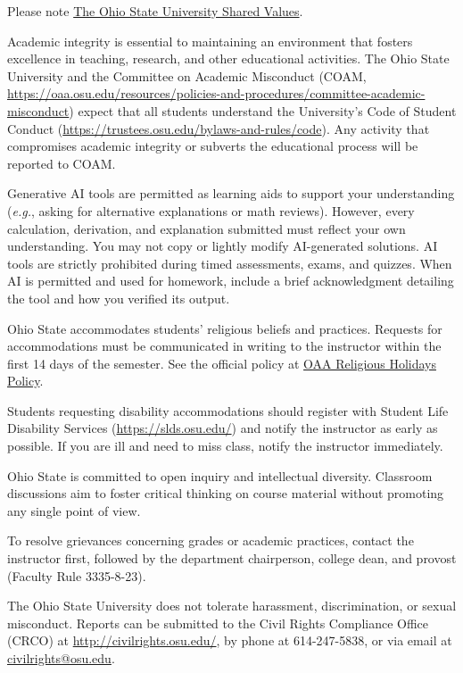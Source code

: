 Please note \href{https://www.osu.edu/shared-values}{The Ohio State University Shared Values}.

Academic integrity is essential to maintaining an environment that fosters excellence in teaching, research, and other educational activities. The Ohio State University and the Committee on Academic Misconduct (COAM, \href{https://oaa.osu.edu/resources/policies-and-procedures/committee-academic-misconduct}{https://oaa.osu.edu/resources/policies-and-procedures/committee-academic-misconduct}) expect that all students understand the University's Code of Student Conduct (\href{https://trustees.osu.edu/bylaws-and-rules/code}{https://trustees.osu.edu/bylaws-and-rules/code}). Any activity that compromises academic integrity or subverts the educational process will be reported to COAM.

Generative AI tools are permitted as learning aids to support your understanding (\emph{e.g.}, asking for alternative explanations or math reviews). However, every calculation, derivation, and explanation submitted must reflect your own understanding. You may not copy or lightly modify AI-generated solutions. AI tools are strictly prohibited during timed assessments, exams, and quizzes. When AI is permitted and used for homework, include a brief acknowledgment detailing the tool and how you verified its output.

Ohio State accommodates students' religious beliefs and practices. Requests for accommodations must be communicated in writing to the instructor within the first 14 days of the semester. See the official policy at \href{https://oaa.osu.edu/resources/policies-and-procedures/religious-holidays-holy-days-and-observances}{OAA Religious Holidays Policy}.

Students requesting disability accommodations should register with Student Life Disability Services (\href{https://slds.osu.edu/}{https://slds.osu.edu/}) and notify the instructor as early as possible. If you are ill and need to miss class, notify the instructor immediately.

Ohio State is committed to open inquiry and intellectual diversity. Classroom discussions aim to foster critical thinking on course material without promoting any single point of view.

To resolve grievances concerning grades or academic practices, contact the instructor first, followed by the department chairperson, college dean, and provost (Faculty Rule 3335-8-23).

The Ohio State University does not tolerate harassment, discrimination, or sexual misconduct. Reports can be submitted to the Civil Rights Compliance Office (CRCO) at \href{http://civilrights.osu.edu/}{http://civilrights.osu.edu/}, by phone at 614-247-5838, or via email at \href{mailto:civilrights@osu.edu}{civilrights@osu.edu}.